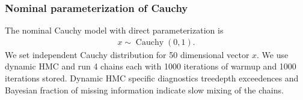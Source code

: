 \documentclass[american,]{article}
\let\oldparagraph\paragraph
\renewcommand{\paragraph}[1]{\oldparagraph{#1}\mbox{}}
\DeclareMathOperator{\Cauchy}{Cauchy}
\begin{document}
\hypertarget{nominal-parameterization-of-cauchy}{%
\subsubsection{Nominal parameterization of
Cauchy}\label{nominal-parameterization-of-cauchy}}






The nominal Cauchy model with direct parameterization is
\begin{align}
  x \sim \Cauchy(0,1).
\end{align}
We set independent Cauchy distribution for 50 dimensional vector $x$.
We use dynamic HMC and run 4 chains each with 1000 iterations of
warmup and 1000 iterations stored. Dynamic HMC specific diagnostics
treedepth exceedences and Bayesian fraction of missing information
indicate slow mixing of the chains.

\end{document}
